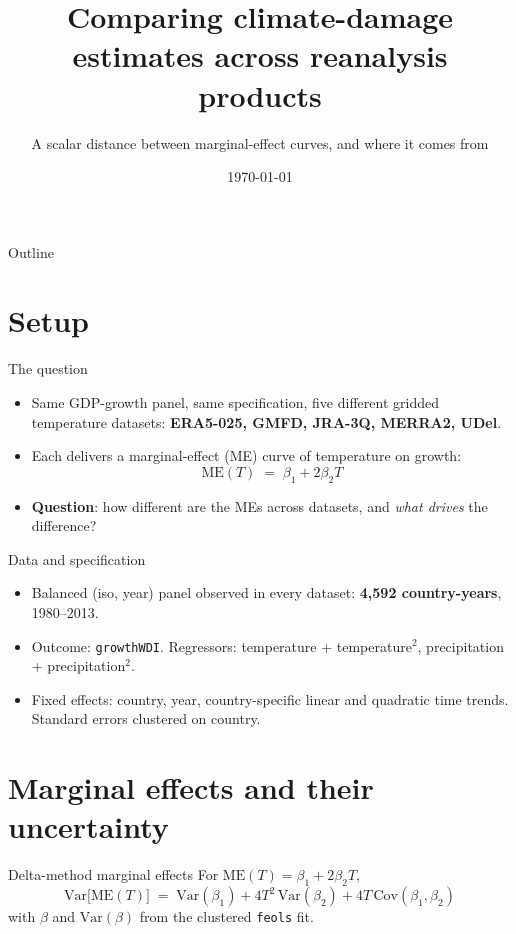 \documentclass[10pt,aspectratio=169]{beamer}
\title{Comparing climate-damage estimates across reanalysis products}
\subtitle{A scalar distance between marginal-effect curves, and where it comes from}
\author{}
\date{\today}
\begin{document}
\begin{frame}
  \titlepage
\end{frame}

\begin{frame}{Outline}
  \tableofcontents
\end{frame}

\section{Setup}

\begin{frame}{The question}
  \begin{itemize}
    \item Same GDP-growth panel, same specification, five different gridded
          temperature datasets: \textbf{ERA5-025, GMFD, JRA-3Q, MERRA2, UDel}.
    \item Each delivers a marginal-effect (ME) curve of temperature on growth:
      \[ \mathrm{ME}(T) \;=\; \beta_1 + 2\beta_2 T \]
    \item \textbf{Question}: how different are the MEs across datasets, and
          \emph{what drives} the difference?
  \end{itemize}
\end{frame}

\begin{frame}{Data and specification}
  \begin{itemize}
    \item Balanced (iso, year) panel observed in every dataset:
          \textbf{4{,}592 country-years}, 1980--2013.
    \item Outcome: \texttt{growthWDI}. Regressors: temperature + temperature$^2$,
          precipitation + precipitation$^2$.
    \item Fixed effects: country, year, country-specific linear and quadratic
          time trends. Standard errors clustered on country.
  \end{itemize}
\end{frame}

\section{Marginal effects and their uncertainty}

\begin{frame}{Delta-method marginal effects}
  For $\mathrm{ME}(T) = \beta_1 + 2\beta_2 T$,
  \[
     \mathrm{Var}\bigl[\mathrm{ME}(T)\bigr]
     \;=\; \mathrm{Var}(\beta_1)
          + 4T^2\,\mathrm{Var}(\beta_2)
          + 4T\,\mathrm{Cov}(\beta_1,\beta_2)
  \]
  with $\beta$ and $\mathrm{Var}(\beta)$ from the clustered \texttt{feols} fit.
\end{frame}
\end{document}
